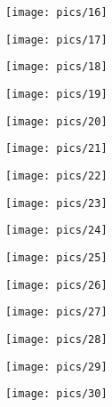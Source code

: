 \documentclass[a4paper,10pt]{article}
\begin{document}
\begin{center}
    \texttt{[image: pics/16]}
\vspace{1em}




    \texttt{[image: pics/17]}
\vspace{1em}




    \texttt{[image: pics/18]}
\vspace{1em}




    \texttt{[image: pics/19]}
\vspace{1em}



    \texttt{[image: pics/20]}
\vspace{1em}




    \texttt{[image: pics/21]}
\vspace{1em}




    \texttt{[image: pics/22]}
\vspace{1em}




    \texttt{[image: pics/23]}
\vspace{1em}




    \texttt{[image: pics/24]}
\vspace{1em}




    \texttt{[image: pics/25]}
\vspace{1em}




    \texttt{[image: pics/26]}
\vspace{1em}




    \texttt{[image: pics/27]}
\vspace{1em}




    \texttt{[image: pics/28]}
\vspace{1em}




    \texttt{[image: pics/29]}
\vspace{1em}



    \texttt{[image: pics/30]}
\vspace{1em}




\end{center}
\end{document}
